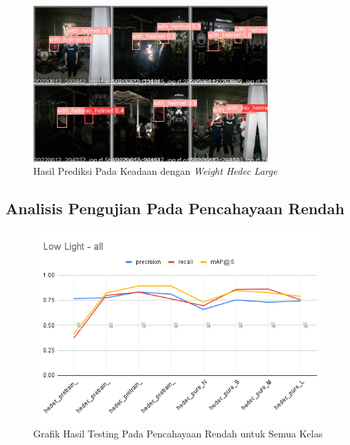 \begin{enumerate}
  \begin{figure} [h!]
    \centering
    \includegraphics[width=0.8\textwidth]{gambar/train_v2_val/low_ligjt/customLarge/val_batch0_pred.jpg}
    \caption{Hasil Prediksi Pada Keadaan dengan \emph{Weight Hedec Large}}
  \end{figure}
  
\end{enumerate}

\subsection{Analisis Pengujian Pada Pencahayaan Rendah}
  \label{subsec:analisis_lowlight}

  \begin{figure} [h!]
    \centering
    \includegraphics[width=1.0\textwidth]{gambar/lowlight_grafic/Low Light - all.png}
    \caption{Grafik Hasil Testing Pada Pencahayaan Rendah untuk Semua Kelas}
    \label{fig:graf_lowlight_all}  
  \end{figure}

